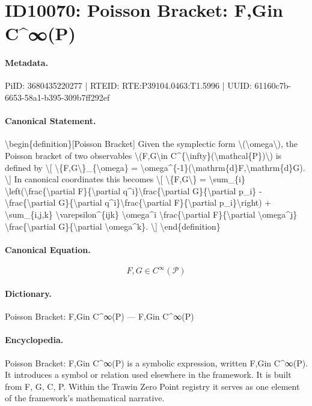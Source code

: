 \section*{ID10070: Poisson Bracket: F,Gin C\textasciicircum{}∞(P)}
\paragraph{Metadata.}
PiID: 3680435220277 | RTEID: RTE:P39104.0463:T1.5996 | UUID: 61160c7b-6653-58a1-b395-309b7ff292ef

\paragraph{Canonical Statement.}
\textbackslash{}begin\{definition\}[Poisson Bracket] Given the symplectic form \textbackslash{}(\textbackslash{}omega\textbackslash{}), the Poisson bracket of two observables \textbackslash{}(F,G\textbackslash{}in C\textasciicircum{}\{\textbackslash{}infty\}(\textbackslash{}mathcal\{P\})\textbackslash{}) is defined by \textbackslash{}[ \textbackslash{}\{F,G\textbackslash{}\}\_\{\textbackslash{}omega\} = \textbackslash{}omega\textasciicircum{}\{-1\}(\textbackslash{}mathrm\{d\}F,\textbackslash{}mathrm\{d\}G). \textbackslash{}] In canonical coordinates this becomes \textbackslash{}[ \textbackslash{}\{F,G\textbackslash{}\} = \textbackslash{}sum\_\{i\} \textbackslash{}left(\textbackslash{}frac\{\textbackslash{}partial F\}\{\textbackslash{}partial q\textasciicircum{}i\}\textbackslash{}frac\{\textbackslash{}partial G\}\{\textbackslash{}partial p\_i\} - \textbackslash{}frac\{\textbackslash{}partial G\}\{\textbackslash{}partial q\textasciicircum{}i\}\textbackslash{}frac\{\textbackslash{}partial F\}\{\textbackslash{}partial p\_i\}\textbackslash{}right) + \textbackslash{}sum\_\{i,j,k\} \textbackslash{}varepsilon\textasciicircum{}\{ijk\} \textbackslash{}omega\textasciicircum{}i \textbackslash{}frac\{\textbackslash{}partial F\}\{\textbackslash{}partial \textbackslash{}omega\textasciicircum{}j\} \textbackslash{}frac\{\textbackslash{}partial G\}\{\textbackslash{}partial \textbackslash{}omega\textasciicircum{}k\}. \textbackslash{}] \textbackslash{}end\{definition\}

\paragraph{Canonical Equation.}
\[
F,G\in C^{\infty}(\mathcal{P})
\]

\paragraph{Dictionary.}
Poisson Bracket: F,Gin C\textasciicircum{}∞(P) — F,Gin C\textasciicircum{}∞(P)

\paragraph{Encyclopedia.}
Poisson Bracket: F,Gin C\textasciicircum{}∞(P) is a symbolic expression, written F,Gin C\textasciicircum{}∞(P). It introduces a symbol or relation used elsewhere in the framework. It is built from F, G, C, P. Within the Trawin Zero Point registry it serves as one element of the framework's mathematical narrative.
